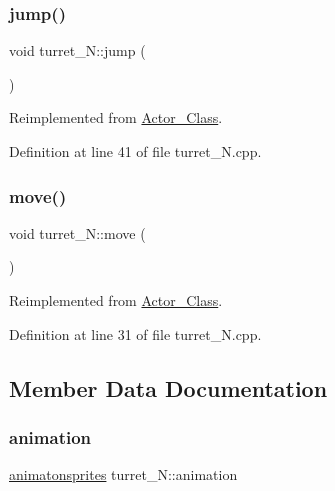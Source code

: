 \subsubsection{\texorpdfstring{jump()}{jump()}}
{\footnotesize\ttfamily void turret\+\_\+\+N\+::jump (\begin{DoxyParamCaption}{ }\end{DoxyParamCaption})\hspace{0.3cm}{\ttfamily [virtual]}}



Reimplemented from \hyperlink{class_actor___class_ab33216a3ce0c856bdc16231c71ae35c2}{Actor\+\_\+\+Class}.



Definition at line 41 of file turret\+\_\+\+N.\+cpp.

\hypertarget{classturret___n_ac8ad5be9e03657d090a45f6198812f35}{}\label{classturret___n_ac8ad5be9e03657d090a45f6198812f35} 
\subsubsection{\texorpdfstring{move()}{move()}}
{\footnotesize\ttfamily void turret\+\_\+\+N\+::move (\begin{DoxyParamCaption}{ }\end{DoxyParamCaption})\hspace{0.3cm}{\ttfamily [virtual]}}



Reimplemented from \hyperlink{class_actor___class_af1764a94c5410ba8476f56553cd2c327}{Actor\+\_\+\+Class}.



Definition at line 31 of file turret\+\_\+\+N.\+cpp.



\subsection{Member Data Documentation}
\hypertarget{classturret___n_aaafd6b92320764ee7eac2554ad79dbc8}{}\label{classturret___n_aaafd6b92320764ee7eac2554ad79dbc8} 
\subsubsection{\texorpdfstring{animation}{animation}}
{\footnotesize\ttfamily \hyperlink{classanimatonsprites}{animatonsprites} turret\+\_\+\+N\+::animation}



